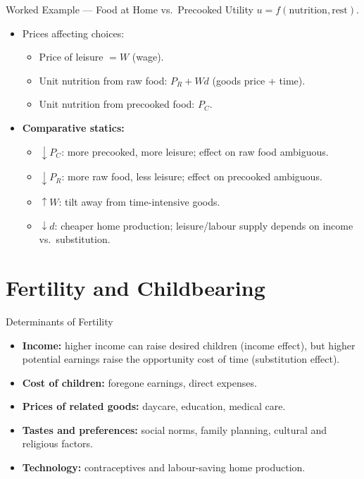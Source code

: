 \documentclass[aspectratio=169]{beamer}
\begin{document}
\begin{frame}{Worked Example — Food at Home vs.\ Precooked}
\transfade
\small
Utility \(u=f(\text{nutrition}, \text{rest})\).\par
\begin{itemize}[<+->]
  \item Prices affecting choices:
  \begin{itemize}[<+->]
    \item Price of leisure \(= W\) (wage).
    \item Unit nutrition from raw food: \(P_R + Wd\) (goods price + time).
    \item Unit nutrition from precooked food: \(P_C\).
  \end{itemize}
  \item \textbf{Comparative statics:}
  \begin{itemize}[<+->]
    \item \(\downarrow P_C\): more precooked, more leisure; effect on raw food ambiguous.
    \item \(\downarrow P_R\): more raw food, less leisure; effect on precooked ambiguous.
    \item \(\uparrow W\): tilt away from time-intensive goods.
    \item \(\downarrow d\): cheaper home production; leisure/labour supply depends on income vs.\ substitution.
  \end{itemize}
\end{itemize}
\end{frame}

\section{Fertility and Childbearing}

\begin{frame}{Determinants of Fertility}
\transfade
\begin{itemize}[<+->]
  \item \textbf{Income:} higher income can raise desired children (income effect), but higher potential earnings raise the opportunity cost of time (substitution effect).
  \item \textbf{Cost of children:} foregone earnings, direct expenses.
  \item \textbf{Prices of related goods:} daycare, education, medical care.
  \item \textbf{Tastes and preferences:} social norms, family planning, cultural and religious factors.
  \item \textbf{Technology:} contraceptives and labour-saving home production.
\end{itemize}
\end{frame}
\end{document}
